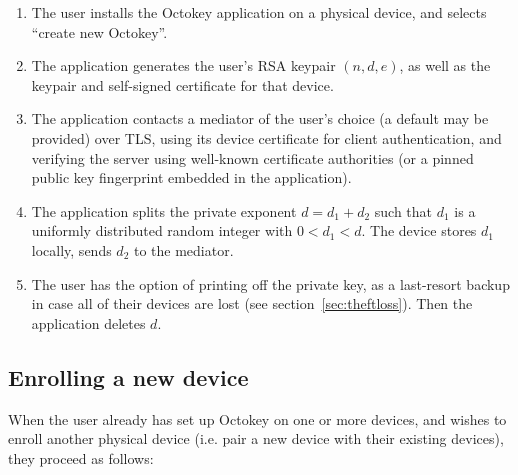 \begin{enumerate}
\item The user installs the Octokey application on a physical device, and selects ``create new
Octokey''.
\item The application generates the user's RSA keypair $(n, d, e)$, as well as the keypair and
self-signed certificate for that device.
\item The application contacts a mediator of the user's choice (a default may be provided) over TLS,
using its device certificate for client authentication, and verifying the server using well-known
certificate authorities (or a pinned public key fingerprint embedded in the application).
\item The application splits the private exponent $d = d_1 + d_2$ such that $d_1$ is a uniformly
distributed random integer with $0 < d_1 < d$. The device stores $d_1$ locally, sends $d_2$ to the
mediator.
\item The user has the option of printing off the private key, as a last-resort backup in case all
of their devices are lost (see section~\ref{sec:theftloss}). Then the application deletes $d$.
\end{enumerate}

\subsection{Enrolling a new device}\label{sec:newdevice}

When the user already has set up Octokey on one or more devices, and wishes to enroll another
physical device (i.e. pair a new device with their existing devices), they proceed as follows:

